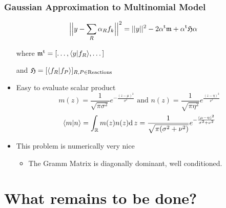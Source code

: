 \documentclass[xetex]{beamer}
\begin{document}
	\begin{frame}\frametitle{Gaussian Approximation to Multinomial Model}

		$$ \Big|\Big| y - \sum_{R} \alpha_R f_k \Big|\Big|^2 = || y ||^2 - 2 \alpha^{\mathrm{t}} \mathfrak{m} + \alpha^{\mathrm{t}} \mathfrak{H} \alpha$$ 

		\begin{itemize}
			\item[where] $\mathfrak{m}^{\mathrm{t}} = [ \dots, \langle y|f_R \rangle, \dots ]$
			\item[and] $\mathfrak{H} = [\langle f_R|f_P \rangle]_{R,P \in \text{Reactions}}$
			\item[] 			
			\item Easy to evaluate scalar product 
			$$ m(z) = \frac{1}{\sqrt{\pi \sigma^2}} e^{-\frac{(z-\mu)^2}{\sigma^2}}\text{ and } 
n(z) = \frac{1}{\sqrt{\pi \eta^2}} e^{\frac{(z-\eta)^2}{\nu^2}}
$$
			$$\langle m|n \rangle = \int_{\mathbb{R}} m(z)n(z) \mathrm{d}\,z  = \frac{1}{\sqrt{\pi (\sigma^2 + \nu^2)}}e^{-\frac{(\mu-\eta)^2}{\sigma^2+\nu^2}}$$  
			\item This problem is numerically very nice
			\begin{itemize}
				\item The Gramm Matrix is diagonally dominant, well conditioned. 
			\end{itemize}
		\end{itemize}

	\end{frame}

\section[Plans]{What remains to be done?}
\end{document}
